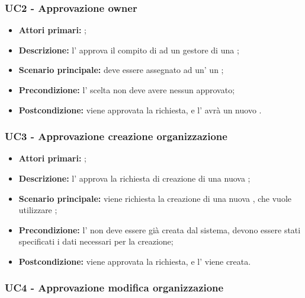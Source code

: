 \documentclass[../analisi-dei-requisiti]{subfiles}
\begin{document}

\subsubsection{UC2 - Approvazione owner}
\label{subsub:UC2}

\begin{itemize}
  \item \textbf{Attori primari:} ;
  \item \textbf{Descrizione:} l' approva il compito di  ad un gestore di una ;
  \item \textbf{Scenario principale:} deve essere assegnato ad un' un ;
  \item \textbf{Precondizione:} l' scelta non deve avere nessun  approvato;
  \item \textbf{Postcondizione:} viene approvata la richiesta, e l' avrà un nuovo .

\end{itemize}
\subsubsection{UC3 - Approvazione creazione organizzazione}
\label{subsub:UC3}

\begin{itemize}
  \item \textbf{Attori primari:} ;
  \item \textbf{Descrizione:} l' approva la richiesta di creazione di una nuova ;
  \item \textbf{Scenario principale:} viene richiesta la creazione di una nuova , che vuole utilizzare ;
  \item \textbf{Precondizione:} l' non deve essere già creata dal sistema, devono essere stati specificati i dati necessari per la creazione;
  \item \textbf{Postcondizione:} viene approvata la richiesta, e l' viene creata.

\end{itemize}
\subsubsection{UC4 - Approvazione modifica organizzazione}
\label{subsub:UC4}
\end{document}
